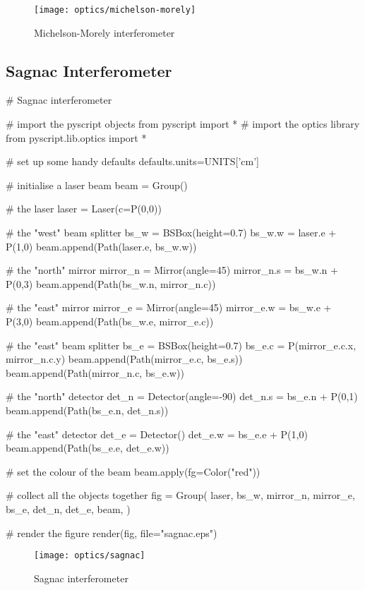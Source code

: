 \begin{figure}[ht]
\centerline{\texttt{[image: optics/michelson-morely]}}
\caption{Michelson-Morely interferometer}
\label{fig:michelson-morely}
\end{figure}

\subsection{Sagnac Interferometer}

\begin{python}
# Sagnac interferometer

# import the pyscript objects
from pyscript import *
# import the optics library
from pyscript.lib.optics import *

# set up some handy defaults
defaults.units=UNITS['cm']

# initialise a laser beam
beam = Group()

# the laser
laser = Laser(c=P(0,0))

# the "west" beam splitter
bs_w = BSBox(height=0.7)
bs_w.w = laser.e + P(1,0)
beam.append(Path(laser.e, bs_w.w))

# the "north" mirror
mirror_n = Mirror(angle=45)
mirror_n.s = bs_w.n + P(0,3)
beam.append(Path(bs_w.n, mirror_n.c))

# the "east" mirror
mirror_e = Mirror(angle=45)
mirror_e.w = bs_w.e + P(3,0)
beam.append(Path(bs_w.e, mirror_e.c))

# the "east" beam splitter
bs_e = BSBox(height=0.7)
bs_e.c = P(mirror_e.c.x, mirror_n.c.y)
beam.append(Path(mirror_e.c, bs_e.s))
beam.append(Path(mirror_n.c, bs_e.w))

# the "north" detector
det_n = Detector(angle=-90)
det_n.s = bs_e.n + P(0,1)
beam.append(Path(bs_e.n, det_n.s))

# the "east" detector
det_e = Detector()
det_e.w = bs_e.e + P(1,0)
beam.append(Path(bs_e.e, det_e.w))

# set the colour of the beam
beam.apply(fg=Color("red"))

# collect all the objects together
fig = Group(
        laser,
        bs_w,
        mirror_n, mirror_e,
        bs_e,
        det_n, det_e,
        beam,
        )

# render the figure
render(fig,
        file="sagnac.eps")
\end{python}

\begin{figure}[ht]
\centerline{\texttt{[image: optics/sagnac]}}
\caption{Sagnac interferometer}
\label{fig:sagnac}
\end{figure}

